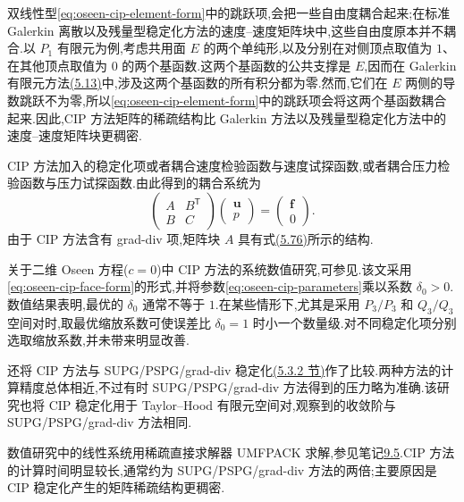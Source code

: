 \begin{note}\label{note:oseen-cip-implementation}
双线性型\cref{eq:oseen-cip-element-form}中的跳跃项,会把一些自由度耦合起来;在标准 Galerkin 离散以及残量型稳定化方法的速度--速度矩阵块中,这些自由度原本并不耦合.以 $P_1$ 有限元为例,考虑共用面 $E$ 的两个单纯形,以及分别在对侧顶点取值为 $1$、在其他顶点取值为 $0$ 的两个基函数.这两个基函数的公共支撑是 $E$,因而在 Galerkin 有限元方法\hyperref[eq:oseen-galerkin-fem]{(5.13)}中,涉及这两个基函数的所有积分都为零.然而,它们在 $E$ 两侧的导数跳跃不为零,所以\cref{eq:oseen-cip-element-form}中的跳跃项会将这两个基函数耦合起来.因此,CIP 方法矩阵的稀疏结构比 Galerkin 方法以及残量型稳定化方法中的速度--速度矩阵块更稠密.

CIP 方法加入的稳定化项或者耦合速度检验函数与速度试探函数,或者耦合压力检验函数与压力试探函数.由此得到的耦合系统为
\[
 \begin{pmatrix}A&B^{\mathsf T}\\B&C\end{pmatrix}
 \begin{pmatrix}\bm{u}\\p\end{pmatrix}
 =\begin{pmatrix}\bm{f}\\0\end{pmatrix}.
\]
由于 CIP 方法含有 grad-div 项,矩阵块 $A$ 具有式\hyperref[eq:oseen-spg-implementation-velocity-block]{(5.76)}所示的结构.
\end{note}

\begin{note}\label{note:oseen-cip-numerical-studies}
关于二维 Oseen 方程($c=0$)中 CIP 方法的系统数值研究,可参见\textcite{Umla2009}.该文采用\cref{eq:oseen-cip-face-form}的形式,并将参数\cref{eq:oseen-cip-parameters}乘以系数 $\delta_0>0$.数值结果表明,最优的 $\delta_0$ 通常不等于 $1$.在某些情形下,尤其是采用 $P_3/P_3$ 和 $Q_3/Q_3$ 空间对时,取最优缩放系数可使误差比 $\delta_0=1$ 时小一个数量级.对不同稳定化项分别选取缩放系数,并未带来明显改善.

\textcite{Umla2009}还将 CIP 方法与 SUPG/PSPG/grad-div 稳定化\hyperref[subsec:oseen-spg-stabilization]{(5.3.2 节)}作了比较.两种方法的计算精度总体相近,不过有时 SUPG/PSPG/grad-div 方法得到的压力略为准确.该研究也将 CIP 稳定化用于 Taylor--Hood 有限元空间对,观察到的收敛阶与 SUPG/PSPG/grad-div 方法相同.

数值研究中的线性系统用稀疏直接求解器 UMFPACK 求解,参见笔记\hyperref[note:umfpack]{9.5}.CIP 方法的计算时间明显较长,通常约为 SUPG/PSPG/grad-div 方法的两倍;主要原因是 CIP 稳定化产生的矩阵稀疏结构更稠密.
\end{note}

